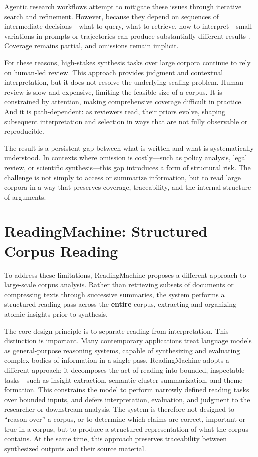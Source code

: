 \documentclass[
  11pt,
]{article}
\begin{document}
Agentic research workflows attempt to mitigate these issues through
iterative search and refinement. However, because they depend on
sequences of intermediate decisions---what to query, what to retrieve,
how to interpret---small variations in prompts or trajectories can
produce substantially different results \cite{yao2022,he2025}. 
Coverage remains partial, and omissions remain implicit.

For these reasons, high-stakes synthesis tasks over large corpora
continue to rely on human-led review. This approach provides judgment
and contextual interpretation, but it does not resolve the underlying
scaling problem. Human review is slow and expensive, limiting the
feasible size of a corpus. It is constrained by attention, making
comprehensive coverage difficult in practice. And it is path-dependent:
as reviewers read, their priors evolve, shaping subsequent
interpretation and selection in ways that are not fully observable or
reproducible.

The result is a persistent gap between what is written and what is
systematically understood. In contexts where omission is costly---such
as policy analysis, legal review, or scientific synthesis---this gap
introduces a form of structural risk. The challenge is not simply to
access or summarize information, but to read large corpora in a way that
preserves coverage, traceability, and the internal structure of
arguments.

\section{ReadingMachine: Structured Corpus
Reading}\label{readingmachine-structured-corpus-reading}

To address these limitations, ReadingMachine proposes a different
approach to large-scale corpus analysis. Rather than retrieving subsets
of documents or compressing texts through successive summaries, the
system performs a structured reading pass across the \textbf{entire}
corpus, extracting and organizing atomic insights prior to synthesis.

The core design principle is to separate reading from interpretation.
This distinction is important. Many contemporary applications treat
language models as general-purpose reasoning systems, capable of
synthesizing and evaluating complex bodies of information in a single
pass. ReadingMachine adopts a different approach: it decomposes the act
of reading into bounded, inspectable tasks---such as insight extraction,
semantic cluster summarization, and theme formation. This constrains the
model to perform narrowly defined reading tasks over bounded inputs, and
defers interpretation, evaluation, and judgment to the researcher or
downstream analysis. The system is therefore not designed to ``reason
over'' a corpus, or to determine which claims are correct, important or
true in a corpus, but to produce a structured representation of what the
corpus contains. At the same time, this approach preserves traceability
between synthesized outputs and their source material.
\end{document}
